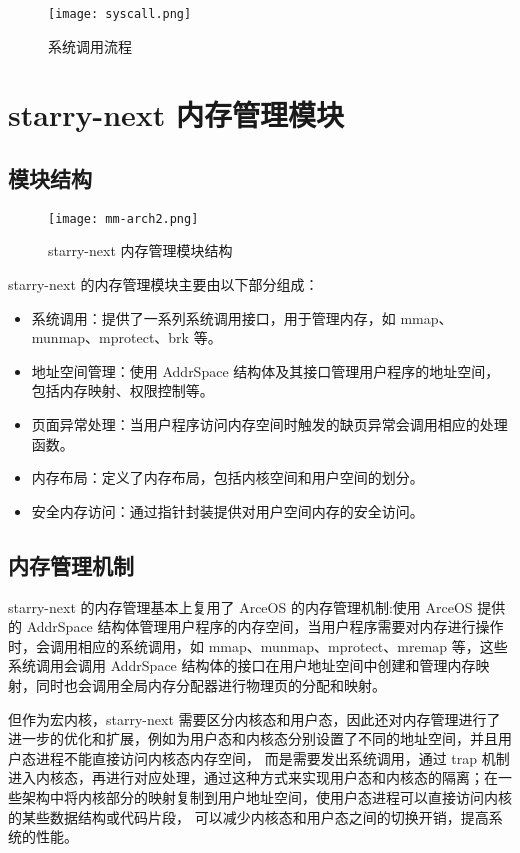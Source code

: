 \begin{figure}[H]
    \centering
    \texttt{[image: syscall.png]}
    \caption{系统调用流程}
    \label{fig:syscall}
\end{figure}


\section{starry-next 内存管理模块}

\subsection{模块结构}

\begin{figure}[H]
    \centering
    \texttt{[image: mm-arch2.png]}
    \caption{starry-next 内存管理模块结构}
    \label{fig:mm-arch}
\end{figure}

starry-next 的内存管理模块主要由以下部分组成：

\begin{itemize}
    \item 系统调用：提供了一系列系统调用接口，用于管理内存，如 mmap、munmap、mprotect、brk 等。
    \item 地址空间管理：使用 AddrSpace 结构体及其接口管理用户程序的地址空间，包括内存映射、权限控制等。
    \item 页面异常处理：当用户程序访问内存空间时触发的缺页异常会调用相应的处理函数。
    \item 内存布局：定义了内存布局，包括内核空间和用户空间的划分。
    \item 安全内存访问：通过指针封装提供对用户空间内存的安全访问。
\end{itemize}

\subsection{内存管理机制}

starry-next 的内存管理基本上复用了 ArceOS 的内存管理机制:使用 ArceOS 提供的 AddrSpace 结构体管理用户程序的内存空间，当用户程序需要对内存进行操作时，会调用相应的系统调用，如 mmap、munmap、mprotect、mremap 等，这些系统调用会调用 AddrSpace 结构体的接口在用户地址空间中创建和管理内存映射，同时也会调用全局内存分配器进行物理页的分配和映射。

但作为宏内核，starry-next 需要区分内核态和用户态，因此还对内存管理进行了进一步的优化和扩展，例如为用户态和内核态分别设置了不同的地址空间，并且用户态进程不能直接访问内核态内存空间，
而是需要发出系统调用，通过 trap 机制进入内核态，再进行对应处理，通过这种方式来实现用户态和内核态的隔离；在一些架构中将内核部分的映射复制到用户地址空间，使用户态进程可以直接访问内核的某些数据结构或代码片段，
可以减少内核态和用户态之间的切换开销，提高系统的性能。

